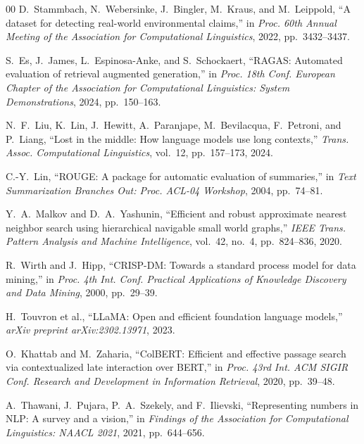 \documentclass[conference]{IEEEtran}
\begin{document}
\begin{thebibliography}{00}
 D.~Stammbach, N.~Webersinke, J.~Bingler, M.~Kraus, and M.~Leippold, ``A dataset for detecting real-world environmental claims,'' in \textit{Proc. 60th Annual Meeting of the Association for Computational Linguistics}, 2022, pp.~3432--3437.

 S.~Es, J.~James, L.~Espinosa-Anke, and S.~Schockaert, ``RAGAS: Automated evaluation of retrieval augmented generation,'' in \textit{Proc. 18th Conf. European Chapter of the Association for Computational Linguistics: System Demonstrations}, 2024, pp.~150--163.

 N.~F.~Liu, K.~Lin, J.~Hewitt, A.~Paranjape, M.~Bevilacqua, F.~Petroni, and P.~Liang, ``Lost in the middle: How language models use long contexts,'' \textit{Trans. Assoc. Computational Linguistics}, vol.~12, pp.~157--173, 2024.

 C.-Y.~Lin, ``ROUGE: A package for automatic evaluation of summaries,'' in \textit{Text Summarization Branches Out: Proc. ACL-04 Workshop}, 2004, pp.~74--81.

 Y.~A.~Malkov and D.~A.~Yashunin, ``Efficient and robust approximate nearest neighbor search using hierarchical navigable small world graphs,'' \textit{IEEE Trans. Pattern Analysis and Machine Intelligence}, vol.~42, no.~4, pp.~824--836, 2020.

 R.~Wirth and J.~Hipp, ``CRISP-DM: Towards a standard process model for data mining,'' in \textit{Proc. 4th Int. Conf. Practical Applications of Knowledge Discovery and Data Mining}, 2000, pp.~29--39.

 H.~Touvron et al., ``LLaMA: Open and efficient foundation language models,'' \textit{arXiv preprint arXiv:2302.13971}, 2023.

 O.~Khattab and M.~Zaharia, ``ColBERT: Efficient and effective passage search via contextualized late interaction over BERT,'' in \textit{Proc. 43rd Int. ACM SIGIR Conf. Research and Development in Information Retrieval}, 2020, pp.~39--48.

 A.~Thawani, J.~Pujara, P.~A.~Szekely, and F.~Ilievski, ``Representing numbers in NLP: A survey and a vision,'' in \textit{Findings of the Association for Computational Linguistics: NAACL 2021}, 2021, pp.~644--656.

\end{thebibliography}
\end{document}
